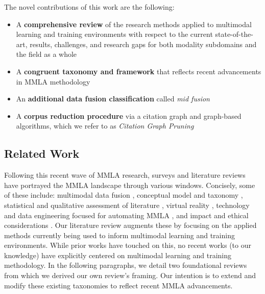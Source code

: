 \documentclass[manuscript,screen,review]{acmart}
\begin{document}
The novel contributions of this work are the following: 
\begin{itemize}
    \item A \textbf{comprehensive review} of the research methods applied to multimodal learning and training environments with respect to the current state-of-the-art, results, challenges, and research gaps for both modality subdomains and the field as a whole
    \item A \textbf{congruent taxonomy and framework} that reflects recent advancements in MMLA methodology
    \item An \textbf{additional data fusion classification} called \textit{mid fusion}
    \item A \textbf{corpus reduction procedure} via a citation graph and graph-based algorithms, which we refer to as \textit{Citation Graph Pruning}
\end{itemize}

\subsection{Related Work} \label{subsec:related_work}

Following this recent wave of MMLA research, surveys and literature reviews have portrayed the MMLA landscape through various windows. Concisely, some of these include: multimodal data fusion \cite{chango_review_nodate}, conceptual model and taxonomy \cite{di_mitri_signals_2018}, statistical and qualitative assessment of literature \cite{sharma_multimodal_2020, qushem_trends_nodate}, virtual reality \cite{philippe_multimodal_2020}, technology and data engineering focused for automating MMLA \cite{chua_technologies_2019}, and impact and ethical considerations \cite{alwahaby_evidence_2021}. Our literature review augments these by focusing on the applied methods currently being used to inform multimodal learning and training environments. While prior works have touched on this, no recent works (to our knowledge) have explicitly centered on multimodal learning and training methodology. In the following paragraphs, we detail two foundational reviews from which we derived our own review's framing. Our intention is to extend and modify these existing taxonomies to reflect recent MMLA advancements. 
\end{document}
